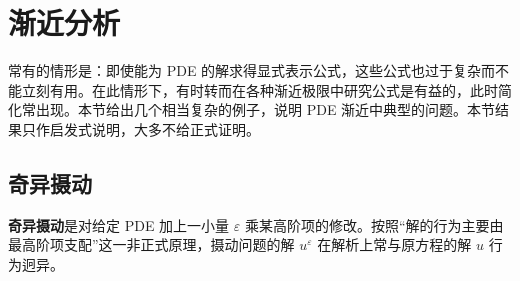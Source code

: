 \documentclass[../../main.tex]{subfiles}
\begin{document}
\section{渐近分析}\label{section:ch04-asymptotics}

常有的情形是：即使能为 PDE 的解求得显式表示公式，这些公式也过于复杂而不能立刻有用。在此情形下，有时转而在各种渐近极限中研究公式是有益的，此时简化常出现。本节给出几个相当复杂的例子，说明 PDE 渐近中典型的问题。本节结果只作启发式说明，大多不给正式证明。

\subsection{奇异摄动}\label{subsection:ch04-singular}

\textbf{奇异摄动}是对给定 PDE 加上一小量 $\varepsilon$ 乘某高阶项的修改。按照``解的行为主要由最高阶项支配''这一非正式原理，摄动问题的解 $u^\varepsilon$ 在解析上常与原方程的解 $u$ 行为迥异。
\end{document}

